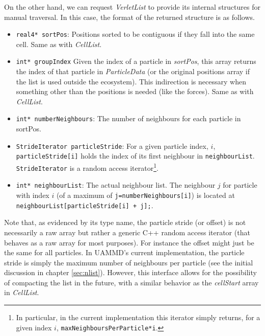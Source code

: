 \documentclass[ twoside,openright,titlepage,numbers=noenddot,%
headinclude,footinclude,cleardoublepage=empty,abstract=on,
BCOR=5mm,paper=b5,fontsize=11pt, dvipsnames
]{scrreprt}
\def\ucpp{uammd_cpp_lexer.py:UAMMDCppLexer -x}
\newcommand{\uammd}{\gls{UAMMD}\xspace}
\begin{document}
On the other hand, we can request \emph{VerletList} to provide its internal structures for manual traversal. In this case, the format of the returned structure is as follows.
\begin{itemize}
\item\texttt{real4* sortPos}:
  Positions sorted to be contiguous if they fall into the same cell. Same as with \emph{CellList}.
\item\texttt{int* groupIndex}
  Given the index of a particle in \emph{sortPos}, this array returns the index of that particle in \emph{ParticleData} (or the original positions array if the list is used outside the ecosystem).
  This indirection is necessary when something other than the positions is needed (like the forces). Same as with \emph{CellList}.
\item\texttt{int* numberNeighbours}:
  The number of neighbours for each particle in sortPos.
\item\texttt{StrideIterator particleStride}:
  For a given particle index, $i$, \texttt{particleStride[i]} holds the index of its first neighbour in \texttt{neighbourList}. \texttt{StrideIterator} is a random access iterator\footnote{In particular, in the current implementation this iterator simply returns, for a given index $i$, \texttt{maxNeighboursPerParticle*i}.}.
\item\texttt{int* neighbourList}:
  The actual neighbour list. The neighbour $j$ for particle with index $i$ (of a maximum of \texttt{j=numberNeighbours[i]}) is located at \texttt{neighbourList[particleStride[i] + j];}.
\end{itemize}

Note that, as evidenced by its type name, the particle stride (or offset) is not necessarily a raw array but rather a generic C++ random access iterator (that behaves as a raw array for most purposes). For instance the offset might just be the same for all particles. In \uammd's current implementation, the particle stride is simply the maximum number of neighbours per particle (see the initial discussion in chapter \ref{sec:nlist}). However, this interface allows for the possibility of compacting the list in the future, with a similar behavior as the \emph{cellStart} array in \emph{CellList}.
\end{document}
